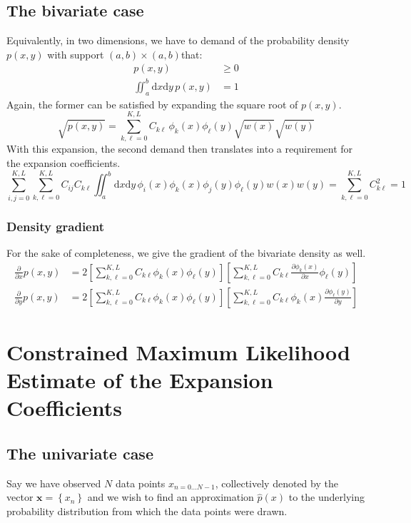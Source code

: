 \documentclass[]{report}
\begin{document}
	\section{The bivariate case}
	Equivalently, in two dimensions, we have to demand of the probability density $p(x,y)$ with support $(a,b)\times(a,b)$that:
	\begin{align}
		p(x, y) & \ge 0 \\
		\iint_a^b\mathrm{d}x\mathrm{d}y\,p(x,y) & = 1 
	\end{align}
	Again, the former can be satisfied by expanding the square root of $p(x,y)$.
	\begin{equation}
		\sqrt{p(x,y)} = \sum_{k, \ell=0}^{K, L}C_{k\ell}\,\phi_k(x)\phi_\ell(y)\sqrt{w(x)}\sqrt{w(y)}
	\end{equation}
	With this expansion, the second demand then translates into a requirement for the expansion coefficients.
	\begin{equation}
		\sum_{i, j=0}^{K, L}\sum_{k, \ell=0}^{K, L}C_{ij}C_{k\ell} \iint_a^b\mathrm{d}x\mathrm{d}y\,\phi_i(x)\phi_k(x)\phi_j(y)\phi_\ell(y)w(x)w(y) = \sum_{k, \ell=0}^{K, L}C_{k\ell}^2 = 1
	\end{equation}
	
		\subsection{Density gradient}
		For the sake of completeness, we give the gradient of the bivariate density as well.
		\begin{align}
			\frac{\partial}{\partial x}p(x, y) & = 2\left[\sum_{k,\ell=0}^{K,L}C_{k\ell}\phi_k(x)\phi_\ell(y)\right]\left[\sum_{k,\ell=0}^{K,L}C_{k\ell}\frac{\partial\phi_k(x)}{\partial x}\phi_\ell(y)\right] \\
			\frac{\partial}{\partial y}p(x, y) & = 2\left[\sum_{k,\ell=0}^{K,L}C_{k\ell}\phi_k(x)\phi_\ell(y)\right]\left[\sum_{k,\ell=0}^{K,L}C_{k\ell}\phi_k(x)\frac{\partial\phi_\ell(y)}{\partial y}\right] \nonumber
		\end{align}

\chapter{Constrained Maximum Likelihood Estimate of the Expansion Coefficients}
	\section{The univariate case}
	Say we have observed $N$ data points $x_{n=0\ldots N-1}$, collectively denoted by the vector $\mathbf{x}=\left\{x_n\right\}$ and we wish to find an approximation $\hat{p}(x)$ to the underlying probability distribution from which the data points were drawn.
	
\end{document}
